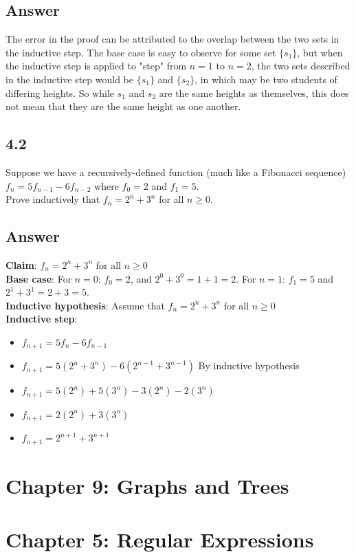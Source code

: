 \documentclass{article}
\begin{document}
\subsection*{Answer}
The error in the proof can be attributed to the overlap between the two sets in the inductive step. The base case is easy to observe for some set $\{s_1\}$, but when the inductive step is applied to "step" from $n=1$ to $n=2$, the two sets described in the inductive step would be $\{s_1\}$ and $\{s_2\}$, in which may be two students of differing heights. So while $s_1$ and $s_2$ are the same heights as themselves, this does not mean that they are the same height as one another.
\newpage
\subsection*{4.2}
Suppose we have a recursively-defined function (much like a Fibonacci sequence) $f_n=5f_{n-1}-6f_{n-2}$ where $f_0=2$ and $f_1=5$.
\\ Prove inductively that $f_n=2^n+3^n$ for all $n\geq0$.
\subsection*{Answer}
\textbf{Claim}: $f_n=2^n+3^n$ for all $n\geq0$
\\ \textbf{Base case}: For $n=0$: $f_0=2$, and $2^0+3^0=1+1=2$. For $n=1$: $f_1=5$ and $2^1+3^1=2+3=5$.
\\ \textbf{Inductive hypothesis}: Assume that $f_n=2^n+3^n$ for all $n\geq0$
\\ \textbf{Inductive step}:
\begin{itemize}[label=]
    \item $f_{n+1}=5f_n-6f_{n-1}$
    \item $f_{n+1}=5(2^n+3^n)-6(2^{n-1}+3^{n-1})$ By inductive hypothesis
    \item $f_{n+1}=5(2^n)+5(3^n)-3(2^n)-2(3^n)$
    \item $f_{n+1}=2(2^n)+3(3^n)$
    \item $f_{n+1}=2^{n+1}+3^{n+1}$
\end{itemize}
\newpage
\section*{Chapter 9: Graphs and Trees}
\newpage
\section*{Chapter 5: Regular Expressions}
\end{document}
